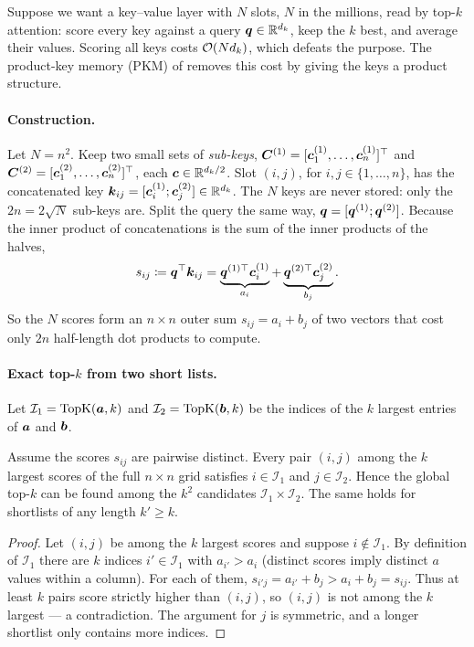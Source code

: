 Suppose we want a key--value layer with $N$ slots, $N$ in the millions, read by top-$k$ attention:
score every key against a query $\bm{q} \in \mathbb{R}^{d_k}$, keep the $k$ best, and average their values.
Scoring all keys costs $\mathcal{O}(N d_k)$, which defeats the purpose. The product-key memory (PKM) of
\citet{c10-lample2019pkm} removes this cost by giving the keys a product structure.

\paragraph{Construction.} Let $N = n^2$. Keep two small sets of \emph{sub-keys},
$\bm{C}^{(1)} = [\bm{c}^{(1)}_1, \dots, \bm{c}^{(1)}_n]^{\top}$ and $\bm{C}^{(2)} = [\bm{c}^{(2)}_1, \dots, \bm{c}^{(2)}_n]^{\top}$,
each $\bm{c} \in \mathbb{R}^{d_k/2}$. Slot $(i,j)$, for $i,j \in \{1,\dots,n\}$, has the concatenated key
$\bm{k}_{ij} = [\bm{c}^{(1)}_i ; \bm{c}^{(2)}_j] \in \mathbb{R}^{d_k}$. The $N$ keys are never stored: only the
$2n = 2\sqrt{N}$ sub-keys are. Split the query the same way, $\bm{q} = [\bm{q}^{(1)} ; \bm{q}^{(2)}]$. Because
the inner product of concatenations is the sum of the inner products of the halves,
\begin{equation}
  s_{ij} \coloneqq \bm{q}^{\top} \bm{k}_{ij} = \underbrace{\bm{q}^{(1)\top} \bm{c}^{(1)}_i}_{a_i}
  + \underbrace{\bm{q}^{(2)\top} \bm{c}^{(2)}_j}_{b_j} .
  \label{eq:c10-pkm-score}
\end{equation}
So the $N$ scores form an $n \times n$ outer sum $s_{ij} = a_i + b_j$ of two vectors that cost
only $2n$ half-length dot products to compute.

\paragraph{Exact top-$k$ from two short lists.} Let $\mathcal{I}_1 = \operatorname{TopK}(\bm{a}, k)$ and
$\mathcal{I}_2 = \operatorname{TopK}(\bm{b}, k)$ be the indices of the $k$ largest entries of $\bm{a}$ and $\bm{b}$.

\begin{proposition}\label{prop:c10-pkm}
Assume the scores $s_{ij}$ are pairwise distinct. Every pair $(i,j)$ among the $k$ largest
scores of the full $n \times n$ grid satisfies $i \in \mathcal{I}_1$ and $j \in \mathcal{I}_2$.
Hence the global top-$k$ can be found among the $k^2$ candidates $\mathcal{I}_1 \times \mathcal{I}_2$.
The same holds for shortlists of any length $k' \ge k$.
\end{proposition}
\begin{proof}
Let $(i,j)$ be among the $k$ largest scores and suppose $i \notin \mathcal{I}_1$. By definition of
$\mathcal{I}_1$ there are $k$ indices $i' \in \mathcal{I}_1$ with $a_{i'} > a_i$ (distinct scores
imply distinct $a$ values within a column). For each of them,
$s_{i'j} = a_{i'} + b_j > a_i + b_j = s_{ij}$. Thus at least $k$ pairs score strictly higher than
$(i,j)$, so $(i,j)$ is not among the $k$ largest --- a contradiction. The argument for $j$ is
symmetric, and a longer shortlist only contains more indices.
\end{proof}

